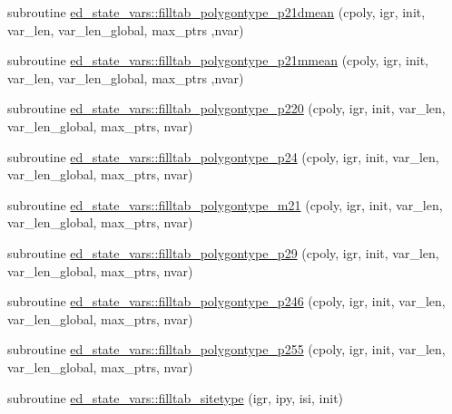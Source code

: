 \begin{DoxyCompactItemize}
\item 
subroutine \hyperlink{namespaceed__state__vars_ade2d35b3ad1ba1f23c8f0a694824064a}{ed\+\_\+state\+\_\+vars\+::filltab\+\_\+polygontype\+\_\+p21dmean} (cpoly, igr, init, var\+\_\+len, var\+\_\+len\+\_\+global, max\+\_\+ptrs                                                                                                                                                                   ,nvar)
\item 
subroutine \hyperlink{namespaceed__state__vars_a9c13af78d563782f9b8d4427488f73b8}{ed\+\_\+state\+\_\+vars\+::filltab\+\_\+polygontype\+\_\+p21mmean} (cpoly, igr, init, var\+\_\+len, var\+\_\+len\+\_\+global, max\+\_\+ptrs                                                                                                                                                                   ,nvar)
\item 
subroutine \hyperlink{namespaceed__state__vars_a7d921b75e21a0601c4dac488c4d1aa01}{ed\+\_\+state\+\_\+vars\+::filltab\+\_\+polygontype\+\_\+p220} (cpoly, igr, init, var\+\_\+len, var\+\_\+len\+\_\+global, max\+\_\+ptrs, nvar)
\item 
subroutine \hyperlink{namespaceed__state__vars_afabb5f55cd27b2d47fc19be14314ee61}{ed\+\_\+state\+\_\+vars\+::filltab\+\_\+polygontype\+\_\+p24} (cpoly, igr, init, var\+\_\+len, var\+\_\+len\+\_\+global, max\+\_\+ptrs, nvar)
\item 
subroutine \hyperlink{namespaceed__state__vars_ada572b0a43655456a132bf574b33ed7f}{ed\+\_\+state\+\_\+vars\+::filltab\+\_\+polygontype\+\_\+m21} (cpoly, igr, init, var\+\_\+len, var\+\_\+len\+\_\+global, max\+\_\+ptrs, nvar)
\item 
subroutine \hyperlink{namespaceed__state__vars_a63083121712f3f902667c53218987e46}{ed\+\_\+state\+\_\+vars\+::filltab\+\_\+polygontype\+\_\+p29} (cpoly, igr, init, var\+\_\+len, var\+\_\+len\+\_\+global, max\+\_\+ptrs, nvar)
\item 
subroutine \hyperlink{namespaceed__state__vars_a767e7b3c2632bb5bae2c57b3d5671780}{ed\+\_\+state\+\_\+vars\+::filltab\+\_\+polygontype\+\_\+p246} (cpoly, igr, init, var\+\_\+len, var\+\_\+len\+\_\+global, max\+\_\+ptrs, nvar)
\item 
subroutine \hyperlink{namespaceed__state__vars_af1a7d7f50a0d28613072bb4a1832c3e3}{ed\+\_\+state\+\_\+vars\+::filltab\+\_\+polygontype\+\_\+p255} (cpoly, igr, init, var\+\_\+len, var\+\_\+len\+\_\+global, max\+\_\+ptrs, nvar)
\item 
subroutine \hyperlink{namespaceed__state__vars_adfda51c18d9eb4eab6a5f2d479eccd29}{ed\+\_\+state\+\_\+vars\+::filltab\+\_\+sitetype} (igr, ipy, isi, init)

\end{DoxyCompactItemize}
